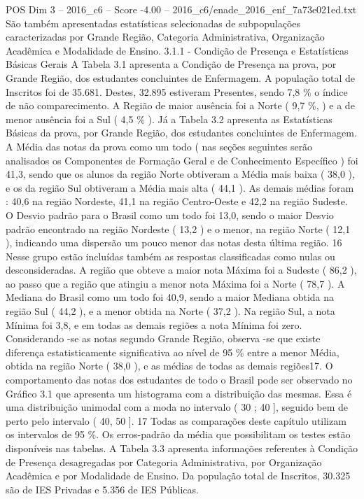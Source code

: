 \begin{textsample}{POS Dim 3 – 2016\_c6 – Score -4.00 – 2016\_c6/enade\_2016\_enf\_7a73e021ed.txt}
São também apresentadas estatísticas selecionadas de subpopulações caracterizadas por Grande Região, Categoria Administrativa, Organização Acadêmica e Modalidade de Ensino. 3.1.1 - Condição de Presença e Estatísticas Básicas Gerais A Tabela 3.1 apresenta a Condição de Presença na prova, por Grande Região, dos estudantes concluintes de Enfermagem.
A população total de Inscritos foi de 35.681.
Destes, 32.895 estiveram Presentes, sendo 7,8 \% o índice de não comparecimento.
A Região de maior ausência foi a Norte ( 9,7 \%, ) e a de menor ausência foi a Sul ( 4,5 \% ).
Já a Tabela 3.2 apresenta as Estatísticas Básicas da prova, por Grande Região, dos estudantes concluintes de Enfermagem.
A Média das notas da prova como um todo ( nas seções seguintes serão analisados os Componentes de Formação Geral e de Conhecimento Específico ) foi 41,3, sendo que os alunos da região Norte obtiveram a Média mais baixa ( 38,0 ), e os da região Sul obtiveram a Média mais alta ( 44,1 ).
As demais médias foram : 40,6 na região Nordeste, 41,1 na região Centro-Oeste e 42,2 na região Sudeste.
O Desvio padrão para o Brasil como um todo foi 13,0, sendo o maior Desvio padrão encontrado na região Nordeste ( 13,2 ) e o menor, na região Norte ( 12,1 ), indicando uma dispersão um pouco menor das notas desta última região. 16 Nesse grupo estão incluídas também as respostas classificadas como nulas ou desconsideradas.
A região que obteve a maior nota Máxima foi a Sudeste ( 86,2 ), ao passo que a região que atingiu a menor nota Máxima foi a Norte ( 78,7 ).
A Mediana do Brasil como um todo foi 40,9, sendo a maior Mediana obtida na região Sul ( 44,2 ), e a menor obtida na Norte ( 37,2 ).
Na região Sul, a nota Mínima foi 3,8, e em todas as demais regiões a nota Mínima foi zero.
Considerando -se as notas segundo Grande Região, observa -se que existe diferença estatisticamente significativa ao nível de 95 \% entre a menor Média, obtida na região Norte ( 38,0 ), e as médias de todas as demais regiões17.
O comportamento das notas dos estudantes de todo o Brasil pode ser observado no Gráfico 3.1 que apresenta um histograma com a distribuição das mesmas.
Essa é uma distribuição unimodal com a moda no intervalo ( 30 ; 40 ], seguido bem de perto pelo intervalo ( 40, 50 ]. 17 Todas as comparações deste capítulo utilizam os intervalos de 95 \%.
Os erros-padrão da média que possibilitam os testes estão disponíveis nas tabelas.
A Tabela 3.3 apresenta informações referentes à Condição de Presença desagregadas por Categoria Administrativa, por Organização Acadêmica e por Modalidade de Ensino.
Da população total de Inscritos, 30.325 são de IES Privadas e 5.356 de IES Públicas.

\end{textsample}
